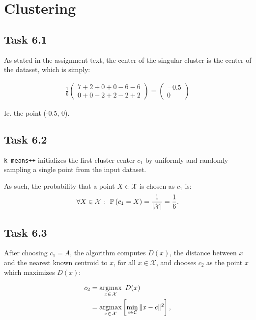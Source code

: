 \newpage
\section{Clustering}
\newcommand{\sed}[1]{\lVert #1 \rVert^2}
\newcommand{\mydist}[2]{\lVert #1 - #2 \rVert^2}
\subsection{Task 6.1}

As stated in the assignment text, the center of the singular cluster is 
the center of the dataset, which is simply:

\begin{align*}
  \frac{1}{6}
  \begin{pmatrix}
  7 + 2 + 0 + 0 - 6 - 6\\
  0 + 0 - 2 + 2 -2 + 2
  \end{pmatrix}
  =
  \begin{pmatrix}
    -0.5\\
    0
  \end{pmatrix}
\end{align*}

Ie. the point (-0.5, 0).

\subsection{Task 6.2}

\texttt{k-means++} initializes the first cluster center $c_1$ by
uniformly and randomly sampling a single point from the input dataset.

As such, the probability that a point $X \in \mathcal X$ is chosen as $c_1$ is:
\begin{align*}
  \forall X \in \mathcal X\, :\  \mathbb P \left(c_1 = X\right) = \frac{1}{|\mathcal X|} =
  \frac{1}{6}.
\end{align*}

\subsection{Task 6.3}

After choosing $c_1 = A$, the algorithm computes $D(x)$, the distance between
$x$ and the nearest known centroid to $x$, for all $x \in \mathcal X$, and %
chooses $c_2$ as the point $x$ which maximizes $D(x)$:

\begin{alignat*}{3}
  c_2 &= \operatorname*{argmax}_{x \in\, \mathcal {X}}\ D(x)\\
      &= \operatorname*{argmax}_{x \in\, \mathcal {X}}\left[ \min_{c \in \mathcal C}\, \lVert
      x - c \rVert ^2\right],
\end{alignat*}

